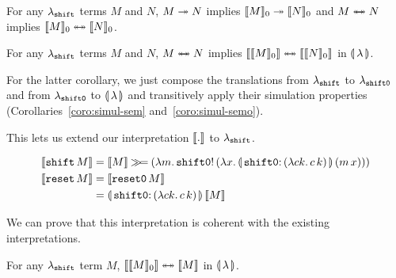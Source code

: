 \begin{corollary}
  \label{coro:simul-semo}
  For any $\lambda_\shift$ terms $M$ and $N$, $M \tto N$ implies $\semo{M}
  \tto \semo{N}$ and $M \ttoffrom N$ implies $\semo{M} \ttoffrom \semo{N}$.
\end{corollary}

\begin{corollary}
  For any $\lambda_\shift$ terms $M$ and $N$, $M \ttoffrom N$ implies
  $\sem{\semo{M}} \ttoffrom \sem{\semo{N}}$ in $\banana{\lambda}$.
\end{corollary}

For the latter corollary, we just compose the translations from
$\lambda_\shift$ to $\lambda_\shifto$ and from $\lambda_\shifto$ to
$\banana{\lambda}$ and transitively apply their simulation properties
(Corollaries~\ref{coro:simul-sem} and~\ref{coro:simul-semo}).

This lets us extend our interpretation $\sem{.}$ to $\lambda_\shift$.

\begin{align*}
  \sem{\ap{\shift}{M}} &= \sem{M} \hsbind (\lam{m}{\ap{\op{shift0}!}{(\lam{x}{\ap{\resetobanana}{(\ap{m}{x})}})}}) \\
  \sem{\ap{\reset}{M}} &= \sem{\ap{\reseto}{M}} \\
                       &= \ap{\resetobanana}{\sem{M}}
\end{align*}

We can prove that this interpretation is coherent with the existing
interpretations.

\begin{property}
  For any $\lambda_\shift$ term $M$, $\sem{\semo{M}} \ttoffrom \sem{M}$ in
  $\banana{\lambda}$.
\end{property}

